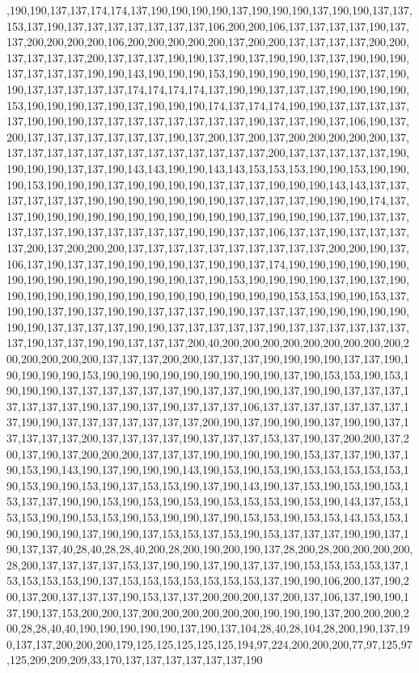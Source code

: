 ,190,190,137,137,174,174,137,190,190,190,190,137,190,190,190,137,190,190,137,137,153,137,190,137,137,137,137,137,137,137,106,200,200,106,137,137,137,137,190,137,137,200,200,200,200,106,200,200,200,200,200,137,200,200,137,137,137,137,200,200,137,137,137,137,200,137,137,137,190,190,137,190,137,190,190,137,137,190,190,190,137,137,137,137,190,190,143,190,190,190,153,190,190,190,190,190,190,137,137,190,190,137,137,137,137,137,174,174,174,174,137,190,190,137,137,137,190,190,190,190,153,190,190,190,137,190,137,190,190,190,174,137,174,174,190,190,137,137,137,137,137,190,190,190,137,137,137,137,137,137,137,137,190,137,137,190,137,106,190,137,200,137,137,137,137,137,137,137,190,137,200,137,200,137,200,200,200,200,200,137,137,137,137,137,137,137,137,137,137,137,137,137,137,200,137,137,137,137,137,190,190,190,190,137,137,190,143,143,190,190,143,143,153,153,153,190,190,153,190,190,190,153,190,190,190,137,190,190,190,190,137,137,137,190,190,190,143,143,137,137,137,137,137,137,190,190,190,190,190,190,190,137,137,137,137,190,190,190,174,137,137,190,190,190,190,190,190,190,190,190,190,190,137,190,190,190,137,190,137,137,137,137,137,190,137,137,137,137,137,190,190,137,137,106,137,137,190,137,137,137,137,200,137,200,200,200,137,137,137,137,137,137,137,137,137,137,200,200,190,137,106,137,190,137,137,190,190,190,190,137,190,190,137,174,190,190,190,190,190,190,190,190,190,190,190,190,190,190,190,137,190,153,190,190,190,190,137,190,137,190,190,190,190,190,190,190,190,190,190,190,190,190,190,190,153,153,190,190,153,137,190,190,137,190,137,190,190,137,137,137,190,190,137,137,137,190,190,190,190,190,190,190,137,137,137,137,190,190,137,137,137,137,137,190,137,137,137,137,137,137,137,190,137,137,190,190,137,137,137,200,40,200,200,200,200,200,200,200,200,200,200,200,200,200,200,137,137,137,200,200,137,137,137,190,190,190,190,137,137,190,190,190,190,190,153,190,190,190,190,190,190,190,190,190,137,190,153,153,190,153,190,190,190,137,137,137,137,137,137,190,137,137,190,190,137,190,190,137,137,137,137,137,137,137,190,137,190,137,190,137,137,137,106,137,137,137,137,137,137,137,137,190,190,137,137,137,137,137,137,137,200,190,137,190,190,190,137,190,190,137,137,137,137,137,200,137,137,137,137,190,137,137,137,153,137,190,137,200,200,137,200,137,190,137,200,200,200,137,137,137,190,190,190,190,190,153,137,137,190,137,190,153,190,143,190,137,190,190,190,143,190,153,190,153,190,153,153,153,153,153,190,153,190,190,153,190,137,153,153,190,137,190,143,190,137,153,190,153,190,153,153,137,137,190,190,153,190,153,190,153,190,153,153,153,190,153,190,143,137,153,153,153,190,190,153,153,190,153,190,190,137,190,153,153,190,153,153,143,153,153,190,190,190,190,137,190,190,137,153,153,137,153,190,153,137,137,137,190,190,137,190,137,137,40,28,40,28,28,40,200,28,200,190,200,190,137,28,200,28,200,200,200,200,28,200,137,137,137,137,153,137,190,190,137,190,137,137,190,153,153,153,153,137,153,153,153,153,190,137,153,153,153,153,153,153,153,137,190,190,106,200,137,190,200,137,200,137,137,137,190,153,137,137,200,200,200,137,200,137,106,137,190,190,137,190,137,153,200,200,137,200,200,200,200,200,200,190,190,190,137,200,200,200,200,28,28,40,40,190,190,190,190,190,137,190,137,104,28,40,28,104,28,200,190,137,190,137,137,200,200,200,179,125,125,125,125,125,194,97,224,200,200,200,77,97,125,97,125,209,209,209,33,170,137,137,137,137,137,137,190